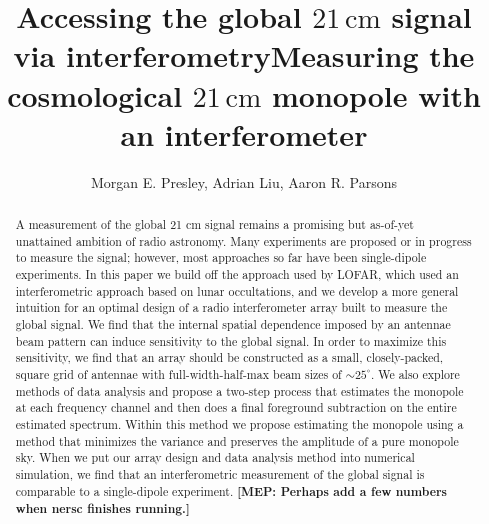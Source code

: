 \documentclass[twolcolumn,apj,iop,numberedappendix]{emulateapj}
\newcommand{\mep}[1]{{\color{applegreen} \textbf{[MEP:  #1]}}}
\begin{document}
\title{Accessing the global $21\,\textrm{cm}$ signal via interferometry}
\title{Measuring the cosmological $21\,\textrm{cm}$ monopole with an interferometer}

\author{Morgan E. Presley,
Adrian Liu,
Aaron R. Parsons
}

\begin{abstract}
A measurement of the global 21 cm signal remains a promising but as-of-yet unattained ambition of radio astronomy. Many experiments are proposed or in progress to measure the signal; however, most approaches so far have been single-dipole experiments. In this paper we build off the approach used by LOFAR, which used an interferometric approach based on lunar occultations, and we develop a more general intuition for an optimal design of a radio interferometer array built to measure the global signal. We find that the internal spatial dependence imposed by an antennae beam pattern can induce sensitivity to the global signal. In order to maximize this sensitivity, we find that an array should be constructed as a small, closely-packed, square grid of antennae with full-width-half-max beam sizes of $\sim25^\circ$. We also explore methods of data analysis and propose a two-step process that estimates the monopole at each frequency channel and then does a final foreground subtraction on the entire estimated spectrum. Within this method we propose estimating the monopole using a method that minimizes the variance and preserves the amplitude of a pure monopole sky. When we put our array design and data analysis method into numerical simulation, we find that an interferometric measurement of the global signal is comparable to a single-dipole experiment. \mep{Perhaps add a few numbers when nersc finishes running.}

\end{abstract}


\end{document}
